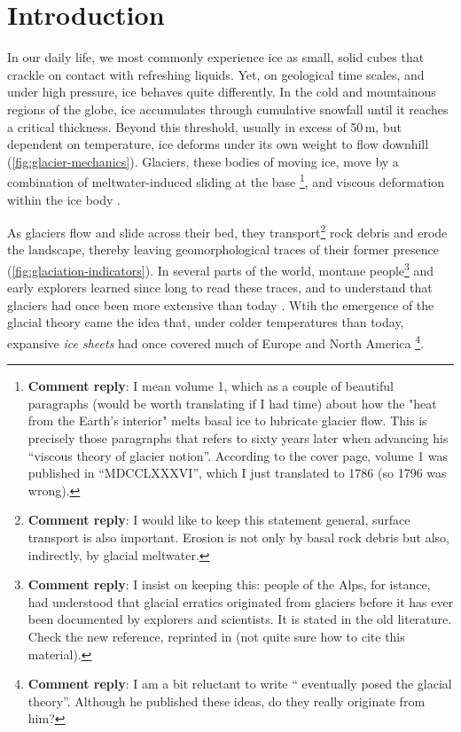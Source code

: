 \documentclass{article}
\newcommand{\renote}[1]{\footnote{\textbf{Comment reply}: #1}}
\begin{document}
\newpage
\tableofcontents
\newpage

\section{Introduction}

In our daily life, we most commonly experience ice as small, solid cubes
that crackle on contact with refreshing liquids. Yet, on geological
time scales, and under high pressure, ice behaves quite differently.
In the cold and mountainous regions of the globe, ice accumulates through
cumulative snowfall until it reaches a critical thickness. Beyond this
threshold, usually in excess of 50\,m, but dependent on temperature, ice
deforms under its own weight to flow downhill (\cref{fig:glacier-mechanics}).
Glaciers, these bodies of moving ice, move by a combination of
meltwater-induced sliding at the base \citep[\S~532]{Saussure.1786}\renote{
    I mean volume 1, which as a couple of beautiful paragraphs (would be worth
    translating if I had time) about how the "heat from the Earth's interior"
    melts basal ice to lubricate glacier flow. This is precisely those
    paragraphs that \citet{Forbes.1846} refers to sixty years later when
    advancing his ``viscous theory of glacier notion''. According to the cover
    page, volume 1 was published in ``MDCCLXXXVI'', which I just translated to
    1786 (so 1796 was wrong).},
and viscous deformation within the
ice body \citep{Forbes.1846b}.

As glaciers flow and slide across their bed, they transport\renote{
    I would like to keep this statement general, surface transport is also
    important. Erosion is not only by basal rock debris but also, indirectly,
    by glacial meltwater.}
rock debris and erode the landscape, thereby leaving geomorphological traces of
their former presence (\cref{fig:glaciation-indicators}). In several parts of
the world, montane people\renote{
    I insist on keeping this: people of the Alps, for istance, had understood
    that glacial erratics originated from glaciers before it has ever been
    documented by explorers and scientists. It is stated in the old literature.
    Check the new reference, reprinted in \citet{Mathews.1898} (not quite sure
    how to cite this material).}
and early explorers learned since long to read these traces, and to
understand that glaciers had once been more extensive than today
\citep[e.g.,][p.~21]{Windham.Martel.1744}. Wtih the emergence of the glacial
theory came the idea that, under colder temperatures
than today, expansive \emph{ice sheets} had once covered much of Europe and
North America \citep{Agassiz.1840}\renote{
    I am a bit reluctant to write ``\citep{Agassiz.1840} eventually posed the
    glacial theory''. Although he published these ideas, do they really
    originate from him?}.
\end{document}
